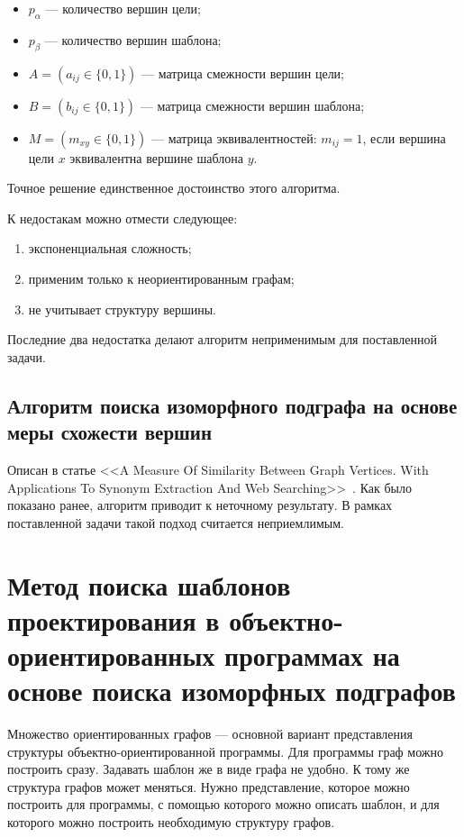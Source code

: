 \begin{itemize}
\item $p_\alpha$ --- количество вершин цели;
\item $p_\beta$ --- количество вершин шаблона;
\item $A = (a_{ij} \in \{ 0, 1 \})$ --- матрица смежности вершин цели;
\item $B = (b_{ij} \in \{ 0, 1 \})$ --- матрица смежности вершин шаблона;
\item $M = (m_{xy} \in \{ 0, 1 \})$ --- матрица эквивалентностей: $m_{ij} = 1$,
если вершина цели $x$ эквивалентна вершине шаблона $y$.
\end{itemize}

Точное решение единственное достоинство этого алгоритма.

К недостакам можно отмести следующее:
\begin{enumerate}
\item экспоненциальная сложность;
\item применим только к неориентированным графам;
\item не учитывает структуру вершины.
\end{enumerate}

Последние два недостатка делают алгоритм неприменимым для поставленной задачи.

\subsection{Алгоритм поиска изоморфного подграфа на основе меры схожести вершин}

Описан в статье <<A Measure Of Similarity Between Graph Vertices.
With Applications To Synonym Extraction And Web Searching>>~\cite{SimilarityGraphVertices}.
Как было показано ранее, алгоритм приводит к неточному результату.
В рамках поставленной задачи такой подход считается неприемлимым.

\section{Метод поиска шаблонов проектирования в объектно-ориентированных программах на основе поиска изоморфных подграфов}

Множество ориентированных графов --- основной вариант представления структуры
объектно-ориентированной программы.
Для программы граф можно построить сразу.
Задавать шаблон же в виде графа не удобно.
К тому же структура графов может меняться.
Нужно представление, которое можно построить для программы,
с помощью которого можно описать шаблон, и для которого можно построить необходимую
структуру графов.

